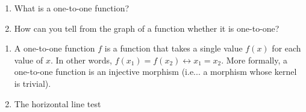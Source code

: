 \begin{exercise}
	{\color{white}{content...}}
	\renewcommand{\labelenumi}{(\alph{enumi})}
	\begin{enumerate}
		\item What is a one-to-one function?
		\item How can you tell from the graph of a function whether it is one-to-one?
	\end{enumerate}
\end{exercise}
\begin{solution}
	{\color{white}{content...}}
	\renewcommand{\labelenumi}{(\alph{enumi})}
	\begin{enumerate}
		\item A one-to-one function $f$ is a function that takes a single value $f\left(x\right)$ for each value of $x$. In other words, $f\left(x_1\right) = f\left(x_2\right) \leftrightarrow x_1 = x_2$. More formally, a one-to-one function is an injective morphism (i.e... a morphism whose kernel is trivial).
		\item The horizontal line test
	\end{enumerate}
\end{solution}
